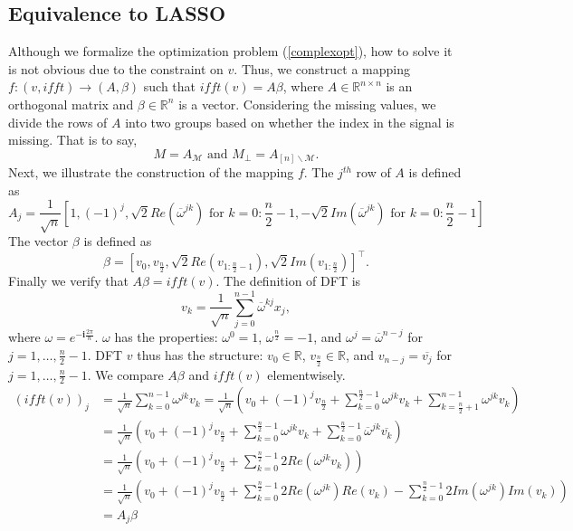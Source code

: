 \documentclass[final,onefignum,onetabnum]{siamart190516}
\begin{document}
\subsection{Equivalence to LASSO}
Although we formalize the optimization problem (\ref{complexopt}), how to solve it is not obvious due to the constraint on $v$. Thus, we construct a mapping $f:(v, ifft)\rightarrow (A,\beta)$ such that $ifft(v) = A\beta$, where $A\in \mathbb{R}^{n\times n}$ is an orthogonal matrix and $\beta\in \mathbb{R}^n$ is a vector. Considering the missing values, we divide the rows of $A$ into two groups based on whether the index in the signal is missing. That is to say,
\begin{equation}
    M = A_{\mathcal{M}}\text{ and }M_{\perp} = A_{[n]\backslash\mathcal{M}}.
\end{equation}
Next, we illustrate the construction of the mapping $f$. The $j^{th}$ row of $A$ is defined as
\begin{equation}\label{A}
    A_j = \frac{1}{\sqrt{n}}[1, (-1)^j, \sqrt{2}Re\left(\overline{\omega}^{jk}\right) \text{ for }k = 0:\frac{n}{2}-1, -\sqrt{2}Im\left(\overline{\omega}^{jk}\right) \text{ for }k = 0:\frac{n}{2}-1]
\end{equation}
The vector $\beta$ is defined as
\begin{equation}\label{beta}
    \beta = [v_0, v_{\frac{n}{2}}, \sqrt{2}Re(v_{1:\frac{n}{2}-1}),  \sqrt{2}Im(v_{1:\frac{n}{2}})]^\top.
\end{equation}
Finally we verify that $A\beta = ifft(v)$. The definition of DFT is
\begin{equation}
    v_{k} = \frac{1}{\sqrt{n}}\sum_{j=0}^{n-1}\overline{\omega}^{kj}x_j,
\end{equation}
where $\omega = e^{-\mathbf{i}\frac{2\pi}{n}}$. $\omega$ has the properties: $\omega^{0} = 1$, $\omega^{\frac{n}{2}}= -1$, and $\omega^{j} = \overline{\omega}^{n-j}$ for $j = 1,\dots,\frac{n}{2}-1$. DFT $v$ thus has the structure: $v_0\in\mathbb{R}$, $v_{\frac{n}{2}}\in\mathbb{R}$, and $v_{n-j} = \overline{v_j}$ for $j = 1,\dots,\frac{n}{2}-1$. We compare $A\beta$ and $ifft(v)$ elementwisely.
\begin{equation}
\begin{aligned}
    \left(ifft(v)\right)_j &= \frac{1}{\sqrt{n}}\sum_{k=0}^{n-1}\omega^{jk}v_k =\frac{1}{\sqrt{n}}\left(v_0 + (-1)^j v_{\frac{n}{2}} +\sum_{k=0}^{\frac{n}{2}-1}\omega^{jk}v_k + \sum_{k=\frac{n}{2}+1}^{n-1}\omega^{jk}v_k\right)\\
    & = \frac{1}{\sqrt{n}}\left(v_0 + (-1)^j v_{\frac{n}{2}} +\sum_{k=0}^{\frac{n}{2}-1}\omega^{jk}v_k + \sum_{k=0}^{\frac{n}{2}-1}\overline{\omega}^{jk}\overline{v_k}\right)\\
    &= \frac{1}{\sqrt{n}}\left(v_0 + (-1)^j v_{\frac{n}{2}} +\sum_{k=0}^{\frac{n}{2}-1}2Re(\omega^{jk}v_k)\right)\\
    &=\frac{1}{\sqrt{n}}\left(v_0 + (-1)^j v_{\frac{n}{2}} +\sum_{k=0}^{\frac{n}{2}-1}2Re(\omega^{jk})Re(v_k) -\sum_{k=0}^{\frac{n}{2}-1} 2Im(\omega^{jk})Im(v_k)\right)\\
    &=A_j\beta
\end{aligned}
\end{equation}
\end{document}
